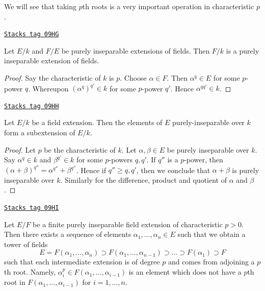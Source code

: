 We will see that taking $p$th roots is a very important operation in
characteristic $p$.

\begin{lemma}
\label{fields-lemma-purely-inseparable-permanence}
\href{https://stacks.math.columbia.edu/tag/09HG}{\texttt{Stacks tag 09HG}}

Let $E/k$ and $F/E$ be purely inseparable extensions of fields. Then $F/k$
is a purely inseparable extension of fields.
\end{lemma}

\begin{proof}
Say the characteristic of $k$ is $p$. Choose $\alpha \in F$. Then
$\alpha^q \in E$ for some $p$-power $q$. Whereupon $(\alpha^q)^{q'} \in k$
for some $p$-power $q'$. Hence $\alpha^{qq'} \in k$.
\end{proof}

\begin{lemma}
\label{fields-lemma-purely-inseparable-elements}
\href{https://stacks.math.columbia.edu/tag/09HH}{\texttt{Stacks tag 09HH}}

Let $E/k$ be a field extension. Then the elements of $E$ purely-inseparable
over $k$ form a subextension of $E/k$.
\end{lemma}

\begin{proof}
Let $p$ be the characteristic of $k$.
Let $\alpha, \beta \in E$ be purely inseparable over $k$. Say
$\alpha^q \in k$ and $\beta^{q'} \in k$ for some $p$-powers $q, q'$.
If $q''$ is a $p$-power, then
$(\alpha + \beta)^{q''} = \alpha^{q''} + \beta^{q''}$.
Hence if $q'' \geq q, q'$, then we conclude that $\alpha + \beta$
is purely inseparable over $k$. Similarly for the difference,
product and quotient of $\alpha$ and $\beta$.
\end{proof}

\begin{lemma}
\label{fields-lemma-finite-purely-inseparable}
\href{https://stacks.math.columbia.edu/tag/09HI}{\texttt{Stacks tag 09HI}}

Let $E/F$ be a finite purely inseparable field extension of
characteristic $p > 0$. Then there exists a sequence of elements
$\alpha_1, \ldots, \alpha_n \in E$ such that we obtain a tower
of fields
$$
E = F(\alpha_1, \ldots, \alpha_n) \supset
F(\alpha_1, \ldots, \alpha_{n - 1}) \supset
\ldots
\supset F(\alpha_1) \supset F
$$
such that each intermediate extension is of degree $p$ and comes
from adjoining a $p$th root. Namely,
$\alpha_i^p \in F(\alpha_1, \ldots, \alpha_{i - 1})$
is an element which does not have a $p$th root in
$F(\alpha_1, \ldots, \alpha_{i - 1})$ for $i = 1, \ldots, n$.
\end{lemma}

